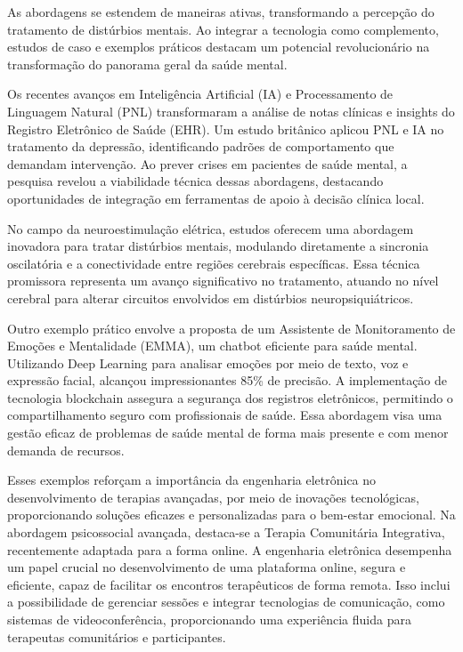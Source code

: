 As abordagens se estendem de maneiras ativas, transformando a percepção do tratamento de distúrbios mentais. Ao integrar a tecnologia como complemento, estudos de caso e exemplos práticos destacam um potencial revolucionário na transformação do panorama geral da saúde mental.

Os recentes avanços em Inteligência Artificial (IA) e Processamento de Linguagem Natural (PNL) transformaram a análise de notas clínicas e insights do Registro Eletrônico de Saúde (EHR). Um estudo britânico aplicou PNL e IA no tratamento da depressão, identificando padrões de comportamento que demandam intervenção. Ao prever crises em pacientes de saúde mental, a pesquisa revelou a viabilidade técnica dessas abordagens, destacando oportunidades de integração em ferramentas de apoio à decisão clínica local. \cite{MSOSA}

No campo da neuroestimulação elétrica, estudos oferecem uma abordagem inovadora para tratar distúrbios mentais, modulando diretamente a sincronia oscilatória e a conectividade entre regiões cerebrais específicas. Essa técnica promissora representa um avanço significativo no tratamento, atuando no nível cerebral para alterar circuitos envolvidos em distúrbios neuropsiquiátricos.\cite{LO}

Outro exemplo prático envolve a proposta de um Assistente de Monitoramento de Emoções e Mentalidade (EMMA), um chatbot eficiente para saúde mental. Utilizando Deep Learning para analisar emoções por meio de texto, voz e expressão facial, alcançou impressionantes 85\% de precisão. A implementação de tecnologia blockchain assegura a segurança dos registros eletrônicos, permitindo o compartilhamento seguro com profissionais de saúde. Essa abordagem visa uma gestão eficaz de problemas de saúde mental de forma mais presente e com menor demanda de recursos.\cite{EMMA}

Esses exemplos reforçam a importância da engenharia eletrônica no desenvolvimento de terapias avançadas, por meio de inovações tecnológicas, proporcionando soluções eficazes e personalizadas para o bem-estar emocional. Na abordagem psicossocial avançada, destaca-se a Terapia Comunitária Integrativa, recentemente adaptada para a forma online. A engenharia eletrônica desempenha um papel crucial no desenvolvimento de uma plataforma online, segura e eficiente, capaz de facilitar os encontros terapêuticos de forma remota. Isso inclui a possibilidade de gerenciar sessões e integrar tecnologias de comunicação, como sistemas de videoconferência, proporcionando uma experiência fluida para terapeutas comunitários e participantes.

